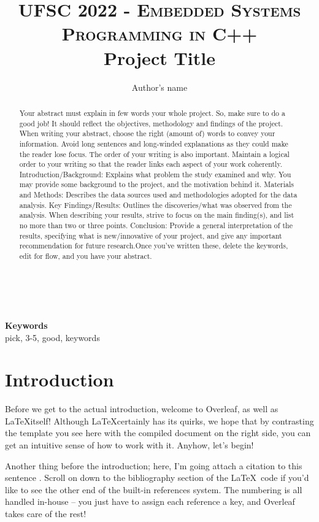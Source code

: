 \documentclass[10pt,twocolumn,letterpaper]{article}
\title{
		\usefont{OT1}{bch}{b}{n}
		\normalfont \normalsize \textsc{UFSC 2022 - Embedded Systems Programming in C++} \\ [10pt]
		\huge Project Title \\
}
\author[1]{Author's name}
\affil[1]{Institution}
\begin{document}
\maketitle

\begin{abstract}
Your abstract must explain in few words your whole project. So, make sure to do a good job! It should reflect the objectives, methodology and findings of the project. When writing your abstract, choose the right (amount of) words to convey your information. Avoid long sentences and long-winded explanations as they could make the reader lose focus. The order of your writing is also important. Maintain a logical order to your writing so that the reader links each aspect of your work coherently. Introduction/Background: Explains what problem the study examined and why. You may provide some background to the project, and the motivation behind it. Materials and Methods: Describes the data sources used and methodologies adopted for the data analysis. Key Findings/Results: Outlines the discoveries/what was observed from the analysis. When describing your results, strive to focus on the main finding(s), and list no more than two or three points. Conclusion: Provide a general interpretation of the results, specifying what is new/innovative of your project, and give any important recommendation for future research.Once you've written these, delete the keywords, edit for flow, and you have your abstract.
\end{abstract} \\ 
\\ 
{\textbf{Keywords} \\
pick, 3-5, good, keywords}

\section{Introduction}
Before we get to the actual introduction, welcome to Overleaf, as well as \LaTeX itself! Although \LaTeX certainly has its quirks, we hope that by contrasting the template you see here with the compiled document on the right side, you can get an intuitive sense of how to work with it. Anyhow, let's begin!

Another thing before the introduction; here, I'm going attach a citation to this sentence \cite{ReferenceName}. Scroll on down to the bibliography section of the \LaTeX\ code if you'd like to see the other end of the built-in references system. The numbering is all handled in-house -- you just have to assign each reference a key, and Overleaf takes care of the rest!
\end{document}
